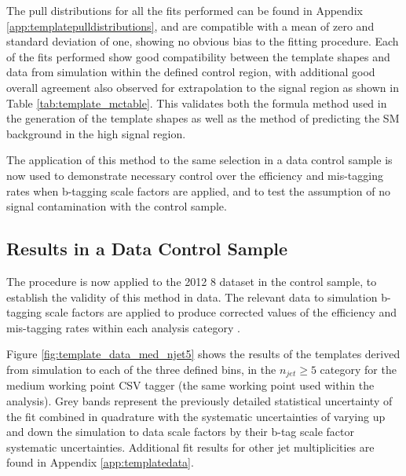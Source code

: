 The pull distributions for all the fits performed can be found in Appendix \ref{app:templatepulldistributions}, and are compatible with a mean of zero and standard deviation of one, showing no obvious bias to the fitting procedure. Each of the fits performed show good compatibility between the template shapes and data from simulation within the defined control region, with additional good overall agreement also observed for extrapolation to the signal region as shown in Table \ref{tab:template_mctable}. This validates both the formula method used in the generation of the template shapes as well as the method of predicting the \ac{SM} background in the high \nbreco signal region. 

The application of this method to the same selection in a data control sample is now used to demonstrate necessary control over the efficiency and mis-tagging rates when b-tagging scale factors are applied, and to test the assumption of no signal contamination with the \mupjets control sample.

\subsection{Results in a Data Control Sample}
\label{subsec:templatedataresults}

The procedure is now applied to the 2012 8 \TeV dataset in the \mupjets control sample, to establish the validity of this method in data. The relevant data to simulation b-tagging scale factors are applied to produce corrected values of the efficiency and mis-tagging rates within each analysis category \cite{btagscalefactor}. 

Figure \ref{fig:template_data_med_njet5} shows the results of the templates derived from simulation to each of the three defined \theht bins, in the $n_{jet} \geq 5$ category for the medium working point \ac{CSV} tagger (the same working point used within the \alphat analysis).  Grey bands represent the previously detailed statistical uncertainty of the fit combined in quadrature with the systematic uncertainties of varying up and down the simulation to data scale factors by their b-tag scale factor systematic uncertainties. Additional fit results for other jet multiplicities are found in Appendix \ref{app:templatedata}.
 
